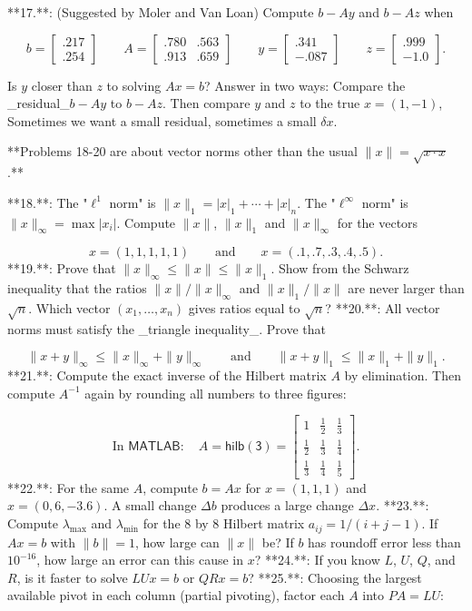 

**17.**: (Suggested by Moler and Van Loan) Compute \(b-Ay\) and \(b-Az\) when

\[b=\begin{bmatrix}.217\\ .254\end{bmatrix}\qquad A=\begin{bmatrix}.780&.563\\ .913&.659\end{bmatrix}\qquad y=\begin{bmatrix}.341\\ -.087\end{bmatrix}\qquad z=\begin{bmatrix}.999\\ -1.0\end{bmatrix}.\]

Is \(y\) closer than \(z\) to solving \(Ax=b\)? Answer in two ways: Compare the _residual_\(b-Ay\) to \(b-Az\). Then compare \(y\) and \(z\) to the true \(x=(1,-1)\), Sometimes we want a small residual, sometimes a small \(\delta x\).

**Problems 18-20 are about vector norms other than the usual \(\|x\|=\sqrt{x\cdot x}\).**

**18.**: The "\(\ell^{1}\) norm" is \(\|x\|_{1}=|x|_{1}+\cdots+|x|_{n}\). The "\(\ell^{\infty}\) norm" is \(\|x\|_{\infty}=\max|x_{i}|\). Compute \(\|x\|\), \(\|x\|_{1}\) and \(\|x\|_{\infty}\) for the vectors

\[x=(1,1,1,1,1)\qquad\text{and}\qquad x=(.1,.7,.3,.4,.5).\]
**19.**: Prove that \(\|x\|_{\infty}\leq\|x\|\leq\|x\|_{1}\). Show from the Schwarz inequality that the ratios \(\|x\|/\|x\|_{\infty}\) and \(\|x\|_{1}/\|x\|\) are never larger than \(\sqrt{n}\). Which vector \((x_{1},\ldots,x_{n})\) gives ratios equal to \(\sqrt{n}\)?
**20.**: All vector norms must satisfy the _triangle inequality_. Prove that

\[\|x+y\|_{\infty}\leq\|x\|_{\infty}+\|y\|_{\infty}\qquad\text{and}\qquad\|x+y \|_{1}\leq\|x\|_{1}+\|y\|_{1}.\]
**21.**: Compute the exact inverse of the Hilbert matrix \(A\) by elimination. Then compute \(A^{-1}\) again by rounding all numbers to three figures:

\[\text{In }\mathsf{MATLAB}:\quad A=\mathsf{hilb(3)}=\begin{bmatrix}1&\frac{1}{2 }&\frac{1}{3}\\ \frac{1}{2}&\frac{1}{3}&\frac{1}{4}\\ \frac{1}{3}&\frac{1}{4}&\frac{1}{5}\end{bmatrix}.\]
**22.**: For the same \(A\), compute \(b=Ax\) for \(x=(1,1,1)\) and \(x=(0,6,-3.6)\). A small change \(\Delta b\) produces a large change \(\Delta x\).
**23.**: Compute \(\lambda_{\max}\) and \(\lambda_{\min}\) for the 8 by 8 Hilbert matrix \(a_{ij}=1/(i+j-1)\). If \(Ax=b\) with \(\|b\|=1\), how large can \(\|x\|\) be? If \(b\) has roundoff error less than \(10^{-16}\), how large an error can this cause in \(x\)?
**24.**: If you know \(L\), \(U\), \(Q\), and \(R\), is it faster to solve \(LUx=b\) or \(QRx=b\)?
**25.**: Choosing the largest available pivot in each column (partial pivoting), factor each \(A\) into \(PA=LU\):

